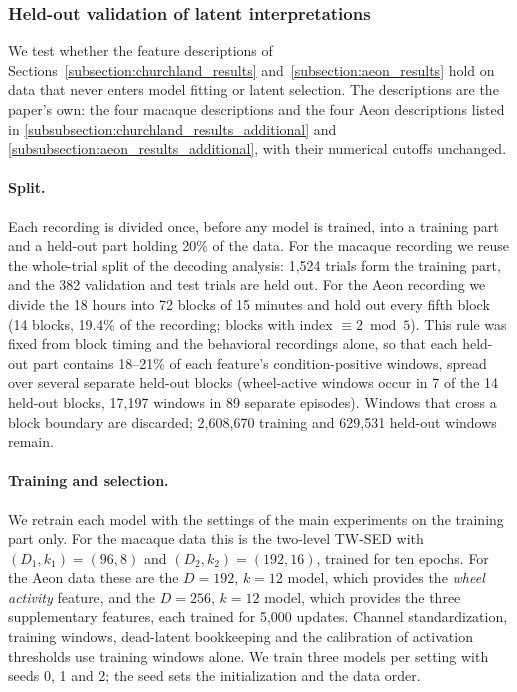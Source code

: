 \subsubsection{Held-out validation of latent interpretations}
\label{subsubsection:rebuttal_heldout}

We test whether the feature descriptions of Sections~\ref{subsection:churchland_results} and~\ref{subsection:aeon_results} hold on data that never enters model fitting or latent selection. The descriptions are the paper's own: the four macaque descriptions and the four Aeon descriptions listed in \hyperref[subsubsection:churchland_results_additional]{\ref*{subsubsection:churchland_results_additional}} and \hyperref[subsubsection:aeon_results_additional]{\ref*{subsubsection:aeon_results_additional}}, with their numerical cutoffs unchanged.

\paragraph{Split.}
Each recording is divided once, before any model is trained, into a training part and a held-out part holding 20\% of the data. For the macaque recording we reuse the whole-trial split of the decoding analysis: 1,524 trials form the training part, and the 382 validation and test trials are held out. For the Aeon recording we divide the 18 hours into 72 blocks of 15 minutes and hold out every fifth block (14 blocks, 19.4\% of the recording; blocks with index $\equiv2 \bmod 5$). This rule was fixed from block timing and the behavioral recordings alone, so that each held-out part contains 18--21\% of each feature's condition-positive windows, spread over several separate held-out blocks (wheel-active windows occur in 7 of the 14 held-out blocks, 17,197 windows in 89 separate episodes). Windows that cross a block boundary are discarded; 2,608,670 training and 629,531 held-out windows remain.

\paragraph{Training and selection.}
We retrain each model with the settings of the main experiments on the training part only. For the macaque data this is the two-level TW-SED with $(D_1,k_1)=(96,8)$ and $(D_2,k_2)=(192,16)$, trained for ten epochs. For the Aeon data these are the $D=192$, $k=12$ model, which provides the \textit{wheel activity} feature, and the $D=256$, $k=12$ model, which provides the three supplementary features, each trained for 5,000 updates. Channel standardization, training windows, dead-latent bookkeeping and the calibration of activation thresholds use training windows alone. We train three models per setting with seeds 0, 1 and 2; the seed sets the initialization and the data order.

